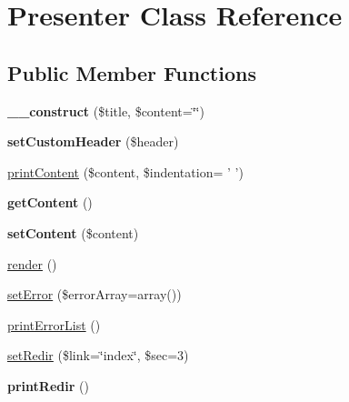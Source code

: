 \hypertarget{classPresenter}{\section{Presenter Class Reference}
\label{classPresenter}
}
\subsection*{Public Member Functions}
\begin{DoxyCompactItemize}
\item 
\hypertarget{classPresenter_a24c04a54ce929bc12219f037a794d439}{{\bfseries \+\_\+\+\_\+construct} (\$title, \$content=\char`\"{}\char`\"{})}\label{classPresenter_a24c04a54ce929bc12219f037a794d439}

\item 
\hypertarget{classPresenter_a299e31916fc252227e369fc5efad77f9}{{\bfseries set\+Custom\+Header} (\$header)}\label{classPresenter_a299e31916fc252227e369fc5efad77f9}

\item 
\hyperlink{classPresenter_a327ab1b725813be28114753935b42cd4}{print\+Content} (\$content, \$indentation= ' ')
\item 
\hypertarget{classPresenter_a8a9d11db6633e0ebb898abd4580f8988}{{\bfseries get\+Content} ()}\label{classPresenter_a8a9d11db6633e0ebb898abd4580f8988}

\item 
\hypertarget{classPresenter_a9a7d0d294934548d13620baca0657087}{{\bfseries set\+Content} (\$content)}\label{classPresenter_a9a7d0d294934548d13620baca0657087}

\item 
\hyperlink{classPresenter_a2194a46cf6c23dd4e483f1ee63bc2236}{render} ()
\item 
\hyperlink{classPresenter_a1d66815ed950c7362a9c87bbcc6d9b7b}{set\+Error} (\$error\+Array=array())
\item 
\hyperlink{classPresenter_a5e4fe61038c5535719c6d7bc3b557019}{print\+Error\+List} ()
\item 
\hyperlink{classPresenter_a517ff93f6c099065a0d67c0994f0b76b}{set\+Redir} (\$link=\char`\"{}index\char`\"{}, \$sec=3)
\item 
\hypertarget{classPresenter_ace2a8a72ee53e6be953614d00e29f741}{{\bfseries print\+Redir} ()}\label{classPresenter_ace2a8a72ee53e6be953614d00e29f741}

\end{DoxyCompactItemize}


